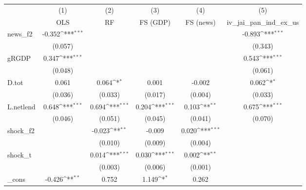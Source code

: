{
\def\sym#1{\ifmmode^{#1}\else\(^{#1}\)\fi}
\begin{tabular}{l*{5}{c}}
\toprule
            &\multicolumn{1}{c}{(1)}&\multicolumn{1}{c}{(2)}&\multicolumn{1}{c}{(3)}&\multicolumn{1}{c}{(4)}&\multicolumn{1}{c}{(5)}\\
            &\multicolumn{1}{c}{OLS}&\multicolumn{1}{c}{RF}&\multicolumn{1}{c}{FS (GDP)}&\multicolumn{1}{c}{FS (news)}&\multicolumn{1}{c}{iv\_jai\_pan\_ind\_ex\_us}\\
\midrule
news\_f2     &      -0.352\sym{***}&                     &                     &                     &      -0.893\sym{***}\\
            &     (0.057)         &                     &                     &                     &     (0.343)         \\
\addlinespace
gRGDP       &       0.347\sym{***}&                     &                     &                     &       0.543\sym{***}\\
            &     (0.048)         &                     &                     &                     &     (0.061)         \\
\addlinespace
D.tot       &       0.061         &       0.064\sym{*}  &       0.001         &      -0.002         &       0.062\sym{*}  \\
            &     (0.036)         &     (0.033)         &     (0.017)         &     (0.004)         &     (0.033)         \\
\addlinespace
L.netlend   &       0.648\sym{***}&       0.694\sym{***}&       0.204\sym{***}&       0.103\sym{**} &       0.675\sym{***}\\
            &     (0.046)         &     (0.051)         &     (0.045)         &     (0.041)         &     (0.070)         \\
\addlinespace
shock\_f2    &                     &      -0.023\sym{**} &      -0.009         &       0.020\sym{***}&                     \\
            &                     &     (0.010)         &     (0.009)         &     (0.004)         &                     \\
\addlinespace
shock\_t     &                     &       0.014\sym{***}&       0.030\sym{***}&       0.002\sym{**} &                     \\
            &                     &     (0.003)         &     (0.006)         &     (0.001)         &                     \\
\addlinespace
\_cons      &      -0.426\sym{**} &       0.752         &       1.149\sym{*}  &       0.262         &                     \\

\end{tabular}}
